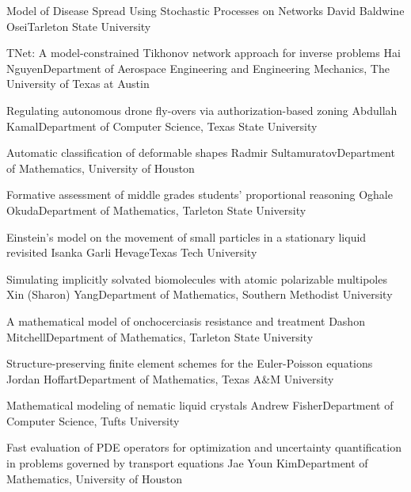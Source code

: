 \begin{posters}
\item\poster %
{Model of Disease Spread Using Stochastic Processes on Networks}
{David Baldwine Osei}{Tarleton State University}

\item\poster %
{TNet: A model-constrained Tikhonov network approach for inverse problems}
{Hai Nguyen}{Department of Aerospace Engineering and Engineering Mechanics, The University of Texas at Austin}

\item\poster %
{Regulating autonomous drone fly-overs via authorization-based zoning}
{Abdullah Kamal}{Department of Computer Science, Texas State University}

\item\poster %
{Automatic classification of deformable shapes}
{Radmir Sultamuratov}{Department of Mathematics, University of Houston}

\item\poster %
{Formative assessment of middle grades students' proportional reasoning}
{Oghale Okuda}{Department of Mathematics, Tarleton State University}

\item\poster %
{Einstein's model on the movement of small particles in a stationary liquid revisited}
{Isanka Garli Hevage}{Texas Tech University}

\item\poster %
{Simulating implicitly solvated biomolecules with atomic polarizable multipoles}
{Xin (Sharon) Yang}{Department of Mathematics, Southern Methodist University}

\item\poster %
{A mathematical model of onchocerciasis resistance and treatment}
{Dashon Mitchell}{Department of Mathematics, Tarleton State University}

\item\poster %
{Structure-preserving finite element schemes for the Euler-Poisson equations}
{Jordan Hoffart}{Department of Mathematics, Texas A\&M University}

\item\poster %
{Mathematical modeling of nematic liquid crystals}
{Andrew Fisher}{Department of Computer Science, Tufts University}

\item\poster %
{Fast evaluation of PDE operators for optimization and uncertainty quantification in problems governed by transport equations}
{Jae Youn Kim}{Department of Mathematics, University of Houston}


\end{posters}
